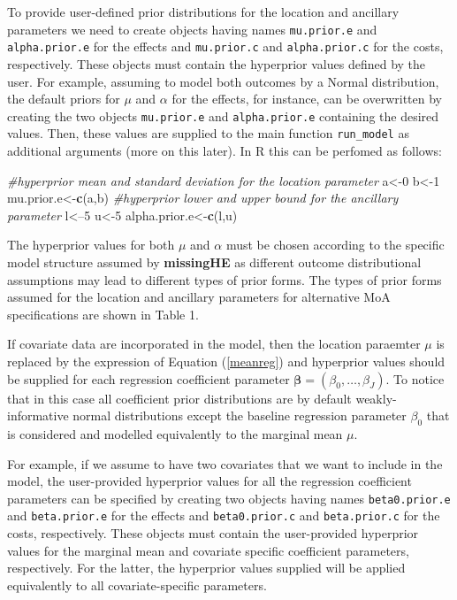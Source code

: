 \documentclass[]{article}
\newenvironment{Shaded}{\begin{snugshade}}{\end{snugshade}}
\newcommand{\KeywordTok}[1]{\textcolor[rgb]{0.13,0.29,0.53}{\textbf{{#1}}}}
\newcommand{\DecValTok}[1]{\textcolor[rgb]{0.00,0.00,0.81}{{#1}}}
\newcommand{\CommentTok}[1]{\textcolor[rgb]{0.56,0.35,0.01}{\textit{{#1}}}}
\newcommand{\NormalTok}[1]{{#1}}
\begin{document}
To provide user-defined prior distributions for the location and
ancillary parameters we need to create objects having names
\texttt{mu.prior.e} and \texttt{alpha.prior.e} for the effects and
\texttt{mu.prior.c} and \texttt{alpha.prior.c} for the costs,
respectively. These objects must contain the hyperprior values defined
by the user. For example, assuming to model both outcomes by a Normal
distribution, the default priors for \(\mu\) and \(\alpha\) for the
effects, for instance, can be overwritten by creating the two objects
\texttt{mu.prior.e} and \texttt{alpha.prior.e} containing the desired
values. Then, these values are supplied to the main function \texttt{run\_model} as
additional arguments (more on this later). In R this can be perfomed as
follows:

\begin{Shaded}
\begin{Highlighting}[]
\CommentTok{#hyperprior mean and standard deviation for the location parameter}
\NormalTok{a<-}\DecValTok{0}
\NormalTok{b<-}\DecValTok{1}
\NormalTok{mu.prior.e<-}\KeywordTok{c}\NormalTok{(a,b)}
\CommentTok{#hyperprior lower and upper bound for the ancillary parameter}
\NormalTok{l<--}\DecValTok{5}
\NormalTok{u<-}\DecValTok{5}
\NormalTok{alpha.prior.e<-}\KeywordTok{c}\NormalTok{(l,u)}
\end{Highlighting}
\end{Shaded}

The hyperprior values for both \(\mu\) and \(\alpha\) must be chosen
according to the specific model structure assumed by \textbf{missingHE}
as different outcome distributional assumptions may lead to different
types of prior forms. The types of prior forms assumed for the location
and ancillary parameters for alternative MoA specifications are shown in
Table 1.

If covariate data are incorporated in the model, then the location
paraemter \(\mu\) is replaced by the expression of Equation
(\ref{meanreg}) and hyperprior values should be supplied for each
regression coefficient parameter
\(\bm{\beta}=\left(\beta_{0},\ldots,\beta_{J}\right)\). To notice that
in this case all coefficient prior distributions are by default
weakly-informative normal distributions except the baseline regression
parameter \(\beta_{0}\) that is considered and modelled equivalently to
the marginal mean \(\mu\).

For example, if we assume to have two covariates that we want to include
in the model, the user-provided hyperprior values for all the
regression coefficient parameters can be specified by creating two
objects having names \texttt{beta0.prior.e} and \texttt{beta.prior.e}
for the effects and \texttt{beta0.prior.c} and \texttt{beta.prior.c} for
the costs, respectively. These objects must contain the user-provided
hyperprior values for the marginal mean and covariate specific
coefficient parameters, respectively. For the latter, the hyperprior
values supplied will be applied equivalently to all covariate-specific
parameters.
\end{document}

